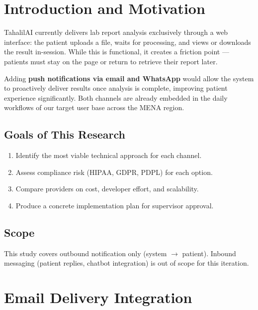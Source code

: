 \documentclass[12pt,a4paper]{article}
\begin{document}
\tableofcontents
\newpage

\section{Introduction and Motivation}

TahalilAI currently delivers lab report analysis exclusively through a web
interface: the patient uploads a file, waits for processing, and views or
downloads the result in-session. While this is functional, it creates a
friction point --- patients must stay on the page or return to retrieve their
report later.

Adding \textbf{push notifications via email and WhatsApp} would allow the
system to proactively deliver results once analysis is complete, improving
patient experience significantly. Both channels are already embedded in the
daily workflows of our target user base across the MENA region.

\subsection{Goals of This Research}

\begin{enumerate}[leftmargin=2em]
    \item Identify the most viable technical approach for each channel.
    \item Assess compliance risk (HIPAA, GDPR, PDPL) for each option.
    \item Compare providers on cost, developer effort, and scalability.
    \item Produce a concrete implementation plan for supervisor approval.
\end{enumerate}

\subsection{Scope}

This study covers outbound notification only (system $\to$ patient). Inbound
messaging (patient replies, chatbot integration) is out of scope for this
iteration.

\section{Email Delivery Integration}
\end{document}
